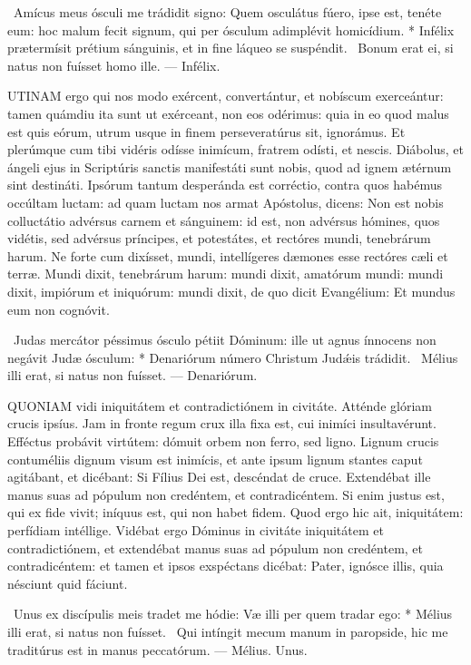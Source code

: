 \R\ Amícus meus ósculi me trádidit signo: Quem osculátus fúero, ipse est, tenéte eum: hoc malum fecit signum, qui per ósculum adimplévit homicídium. * Infélix prætermísit prétium sánguinis, et in fine láqueo se suspéndit. \V\ Bonum erat ei, si natus non fuísset homo ille. --- Infélix.


\lettrine[lines=2]{U}{TINAM} ergo qui nos modo exércent, convertántur, et nobíscum exerceántur: tamen quámdiu ita sunt ut exérceant, non eos odérimus: quia in eo quod malus est quis eórum, utrum usque in finem perseveratúrus sit, ignorámus. Et plerúmque cum tibi vidéris odísse inimícum, fratrem odísti, et nescis. Diábolus, et ángeli ejus in Scriptúris sanctis manifestáti sunt nobis, quod ad ignem ætérnum sint destináti. Ipsórum tantum desperánda est corréctio, contra quos habémus occúltam luctam: ad quam luctam nos armat Apóstolus, dicens: Non est nobis colluctátio advérsus carnem et sánguinem: id est, non advérsus hómines, quos vidétis, sed advérsus príncipes, et potestátes, et rectóres mundi, tenebrárum harum. Ne forte cum dixísset, mundi, intellígeres dæmones esse rectóres cæli et terræ. Mundi dixit, tenebrárum harum: mundi dixit, amatórum mundi: mundi dixit, impiórum et iniquórum: mundi dixit, de quo dicit Evangélium: Et mundus eum non cognóvit.

\R\ Judas mercátor péssimus ósculo pétiit Dóminum: ille ut agnus ínnocens non negávit Judæ ósculum: * Denariórum número Christum Judǽis trádidit. \V\ Mélius illi erat, si natus non fuísset. --- Denariórum.


\lettrine[lines=2]{Q}{UONIAM} vidi iniquitátem et contradictiónem in civitáte. Atténde glóriam crucis ipsíus. Jam in fronte regum crux illa fixa est, cui inimíci insultavérunt. Efféctus probávit virtútem: dómuit orbem non ferro, sed ligno. Lignum crucis contuméliis dignum visum est inimícis, et ante ipsum lignum stantes caput agitábant, et dicébant: Si Fílius Dei est, descéndat de cruce. Extendébat ille manus suas ad pópulum non credéntem, et contradicéntem. Si enim justus est, qui ex fide vivit; iníquus est, qui non habet fidem. Quod ergo hic ait, iniquitátem: perfídiam intéllige. Vidébat ergo Dóminus in civitáte iniquitátem et contradictiónem, et extendébat manus suas ad pópulum non credéntem, et contradicéntem: et tamen et ipsos exspéctans dicébat: Pater, ignósce illis, quia nésciunt quid fáciunt.

\R\ Unus ex discípulis meis tradet me hódie: Væ illi per quem tradar ego: * Mélius illi erat, si natus non fuísset. \V\ Qui intíngit mecum manum in paropside, hic me traditúrus est in manus peccatórum. --- Mélius. Unus.


